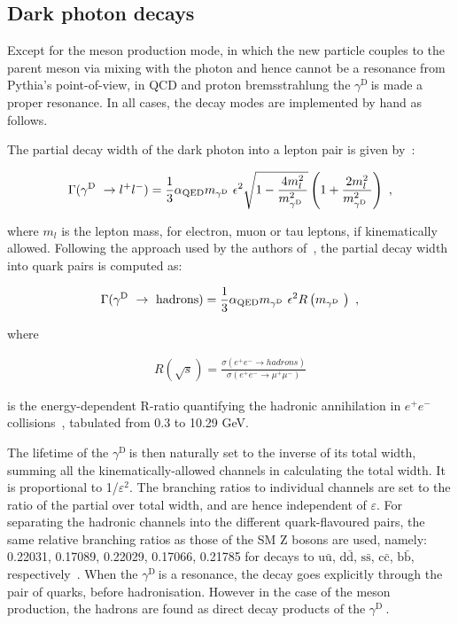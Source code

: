 \documentclass[12pt,a4paper,]{article}
\newcommand{\mathDP}{\gamma^{\mathrm{D}}\ }
\newcommand{\DP}{$\mathDP$}
\begin{document}
\subsection{Dark photon decays}
\label{sec:decay}

Except for the meson production mode, in which the new particle
couples to the parent meson via mixing with the photon and hence
cannot be a resonance from Pythia's point-of-view, in QCD and proton
bremsstrahlung the \DP is made a proper resonance. In all cases, the
decay modes are implemented by hand as follows.

The partial decay width of the dark photon into a lepton pair is given by~\cite{Blumlein:2013cua}:

\begin{align}
	\Gamma(\mathDP \rightarrow l^+ l^-) = \frac{1}{3} \alpha_{\rm QED} m_{\mathDP} \epsilon^2 \sqrt{1 - \frac{4 m_l^2}{m_{\mathDP}^2}}\left(1 + \frac{2 m_l^2}{m_{\mathDP}^2}\right)~,\label{eq:dp-decay}
\end{align}

where $m_l$ is the lepton mass, for electron, muon or tau leptons, if
kinematically allowed. Following the approach used by the authors
of~\cite{Bjorken:2009mm}, the partial decay width into quark pairs is
computed as:

\begin{align}
	\Gamma(\mathDP \rightarrow~\text{hadrons}) = \frac{1}{3} \alpha_{\rm QED} m_{\mathDP} \epsilon^2 
	R\left(m_{\mathDP}\right)~,
\end{align}

where

\begin{align}
	R\left(\sqrt{s}\right) = \frac{\sigma(e^+e^- \rightarrow hadrons)}{\sigma(e^+e^- \rightarrow \mu^+\mu^-)}
\end{align}

is the energy-dependent R-ratio quantifying the hadronic annihilation
in $e^+e^-$ collisions~\cite{Agashe:2014kda}, tabulated from 0.3 to
10.29 GeV.


The lifetime of the \DP is then naturally set to the inverse of its
total width, summing all the kinematically-allowed channels in
calculating the total width. It is proportional to
1/$\varepsilon^2$. The branching ratios to individual channels are set
to the ratio of the partial over total width, and are hence
independent of $\varepsilon$. For separating the hadronic channels
into the different quark-flavoured pairs, the same relative branching
ratios as those of the SM Z bosons are used, namely: 0.22031,
0.17089, 0.22029, 0.17066, 0.21785 for decays to
$\mathrm{u}\bar{\mathrm{u}}$, $\mathrm{d}\bar{\mathrm{d}}$, $\mathrm{s}\bar{\mathrm{s}}$,
$\mathrm{c}\bar{\mathrm{c}}$, $\mathrm{b}\bar{\mathrm{b}}$,
respectively~\cite{Sjostrand:2014zea}. When the \DP is a resonance,
the decay goes explicitly through the pair of quarks, before
hadronisation. However in the case of the meson production, the
hadrons are found as direct decay products of the \DP.
\end{document}
